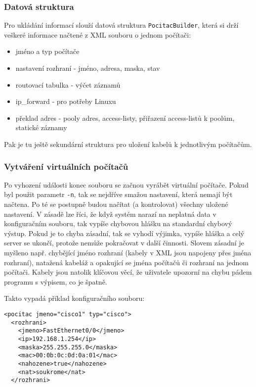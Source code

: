 \subsubsection{Datová struktura}
Pro ukládání informací slouží datová struktura \verb|PocitacBuilder|, která si drží veškeré informace načtené z XML souboru o jednom počítači:
\begin{itemize}
 \item jméno a typ počítače
 \item nastavení rozhraní - jméno, adresa, maska, stav
 \item routovací tabulka - výčet záznamů
 \item ip\_forward - pro potřeby Linuxu
 \item překlad adres - pooly adres, access-listy, přiřazení access-listů k poolům, statické záznamy
\end{itemize}

Pak je tu ještě sekundární struktura pro uložení kabelů k jednotlivým počítačům.

\subsubsection{Vytváření virtuálních počítačů}
Po vyhození události konec souboru se začnou vyrábět virtuální počítače. Pokud byl použit parametr \verb|-n|, tak se nejdříve smažou nastavení, která nemají být načtena. Po té se postupně budou načítat (a kontrolovat) všechny uložené nastavení. V zásadě lze říci, že když systém narazí na neplatná data v konfiguračním souboru, tak vypíše chybovou hlášku na standardní chybový výstup. Pokud je to chyba zásadní, tak se vyhodí výjimka, vypíše hláška a celý server se ukončí, protože nemůže pokračovat v další činnosti. Slovem zásadní je myšleno např. chybějící jméno rozhraní (kabely v XML jsou napojeny přes jména rozhraní), natažená kabeláž a opakující se jména počítačů či rozhraní na jednom počítači. Kabely jsou natolik klíčovou věcí, že uživatele upozorní na chybu pádem programu s výpisem, co je špatně. 

Takto vypadá příklad konfiguračního souboru:
\begin{verbatim}
<pocitac jmeno="cisco1" typ="cisco">
  <rozhrani>
    <jmeno>FastEthernet0/0</jmeno>
    <ip>192.168.1.254</ip>
    <maska>255.255.255.0</maska>
    <mac>00:0b:0c:0d:0a:01</mac>
    <nahozene>true</nahozene>
    <nat>soukrome</nat>
  </rozhrani>
\end{verbatim} 


